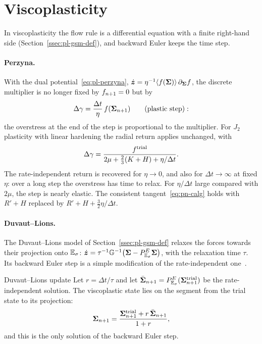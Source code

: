 \section{Viscoplasticity}\label{sec:pn-vp}
%
In viscoplasticity the flow rule is a differential equation with a finite
right-hand side (Section~\ref{ssec:pl-gsm-def}), and backward Euler keeps the
time step.

\paragraph{Perzyna.}
%
With the dual potential~\eqref{eq:pl-perzyna},
$\dot{\bm{z}}=\eta^{-1}\langle f(\bm{\Sigma})\rangle\,\partial_{\bm{\Sigma}}f$, the discrete multiplier
is no longer fixed by $f_{n+1}=0$ but by
\begin{equation}\label{eq:pn-perzyna}
  \Delta\gamma=\frac{\Delta t}{\eta}\,f(\bm{\Sigma}_{n+1})\qquad\text{(plastic step)}:
\end{equation}
the overstress at the end of the step is proportional to the multiplier. For
$J_2$ plasticity with linear hardening the radial return applies unchanged,
with
\begin{equation}\label{eq:pn-perzyna-j2}
  \Delta\gamma=\frac{f^{\mathrm{trial}}}{2\mu+\tfrac23(K+H)+\eta/\Delta t} .
\end{equation}
The rate-independent return is recovered for $\eta\to0$, and also for
$\Delta t\to\infty$ at fixed $\eta$: over a long step the overstress has time to
relax. For $\eta/\Delta t$ large compared with $2\mu$, the step is nearly
elastic. The consistent tangent~\eqref{eq:pn-calg} holds with $R'+H$ replaced
by $R'+H+\tfrac32\eta/\Delta t$.

\paragraph{Duvaut--Lions.}
%
The Duvaut--Lions model of Section~\ref{ssec:pl-gsm-def} relaxes the forces
towards their projection onto $\mathbb{E}_{\sigma}$:
$\dot{\bm{z}}=\tau^{-1}\mathbb{G}^{-1}\bigl(\bm{\Sigma}-P^E_{\mathbb{E}_{\sigma}}\bm{\Sigma}\bigr)$, with the
relaxation time $\tau$. Its backward Euler step is a simple modification of
the rate-independent one~\cite[Sec.~2.7]{SimoHughesCI}.
\begin{gbox}{Duvaut--Lions update}\label{prop:pn-dl}
Let $r=\Delta t/\tau$ and let $\bar{\bm{\Sigma}}_{n+1}=P^E_{\mathbb{E}_{\sigma}}(\bm{\Sigma}^{\mathrm{trial}}_{n+1})$ be
the rate-independent solution. The viscoplastic state lies on the segment
from the trial state to its projection:
\begin{equation}\label{eq:pn-dl}
  \bm{\Sigma}_{n+1}=\frac{\bm{\Sigma}^{\mathrm{trial}}_{n+1}+r\,\bar{\bm{\Sigma}}_{n+1}}{1+r},
\end{equation}
and this is the only solution of the backward Euler step.
\end{gbox}
